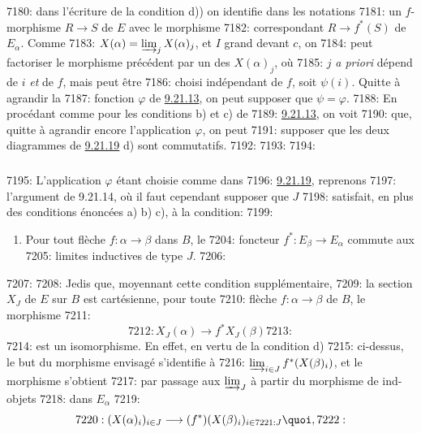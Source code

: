 7180: dans l'écriture de la condition d)) on identifie dans les notations
7181: un $f$-morphisme $R\rightarrow S$ de $E$ avec le morphisme
7182: correspondant $R\rightarrow f^\ast(S)$ de $E_{\alpha}$. Comme
7183: $X(\alpha)=\varinjlim_j X(\alpha)_j$, et $I$ grand devant $c$, on
7184: peut factoriser le morphisme précédent par un des $X(\alpha)_j$, où
7185: $j$ \textit{a priori} dépend de $i$ \emph{et} de $f$, mais peut être
7186: choisi indépendant de $f$, soit $\psi(i)$. Quitte à agrandir la
7187: fonction $\varphi$ de \hyperref[I.lem9.21.13]{9.21.13}, on peut supposer que $\psi=\varphi$.
7188: En procédant comme pour les conditions b) et c) de
7189: \hyperref[I.lem9.21.13]{9.21.13}, on voit
7190: que, quitte à agrandir encore l'application $\varphi$, on peut
7191: supposer que les deux diagrammes de \hyperref[I.lem9.21.19]{9.21.19} d) sont commutatifs.
7192: 
7193: \setcounter{subsection}{21} \setcounter{subsubsection}{19}
7194: \subsubsection{}
7195: L'application $\varphi$ étant choisie comme dans
7196: \hyperref[I.lem9.21.19]{9.21.19}, reprenons
7197: l'argument de 9.21.14, où il faut cependant supposer que $J$
7198: satisfait, en plus des conditions énoncées a) b) c), à la condition:
7199: \begin{enumerate}
7200: \renewcommand{\theenumi}{\alph{enumi}}
7201: \renewcommand{\labelenumi}{\theenumi)}
7202: \setcounter{enumi}{3}
7203: \item Pour tout flèche $f:\alpha\rightarrow \beta$ dans $B$, le
7204: foncteur $f^\ast:E_{\beta}\rightarrow E_{\alpha}$ commute aux
7205: limites inductives de type $J$.
7206: \end{enumerate}
7207: 
7208: Je\pageoriginale dis que, moyennant cette condition supplémentaire,
7209: la section $X_J$ de $E$ sur $B$ est cartésienne, \ie pour toute
7210: flèche $f:\alpha\rightarrow \beta$ de $B$, le morphisme
7211: \begin{equation}
7212: X_J(\alpha)\longrightarrow f^\ast X_J(\beta)\tag{$\ast$}
7213: \end{equation}
7214: est un isomorphisme. En effet, en vertu de la condition d)
7215: ci-dessus, le but du morphisme envisagé s'identifie à
7216: $\varinjlim_{i\in J}f^\ast(X(\beta)_i)$, et le morphisme s'obtient
7217: par passage aux $\varinjlim_J$ à partir du morphisme de ind-objets
7218: dans $E_{\alpha}$
7219: $$
7220: (X(\alpha)_i)_{i\in J}\longrightarrow (f^\ast)(X(\beta)_i)_{i\in
7221: J}{\quoi},
7222: $$
